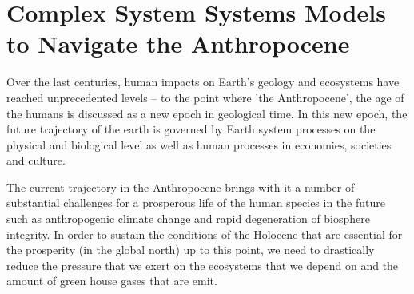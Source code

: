 \section{Complex System Systems Models to Navigate the Anthropocene}


Over the last centuries, human impacts on Earth's geology and ecosystems have reached unprecedented levels -- to the point where 'the Anthropocene', the age of the humans is discussed as a new epoch in geological time. In this new epoch, the future trajectory of the earth is governed by Earth system processes on the physical and biological level as well as human processes in economies, societies and culture.

The current trajectory in the Anthropocene brings with it a number of substantial challenges for a prosperous life of the human species in the future such as anthropogenic climate change and rapid degeneration of biosphere integrity. In order to sustain the conditions of the Holocene that are essential for the prosperity (in the global north) up to this point, we need to drastically reduce the pressure that we exert on the ecosystems that we depend on and the amount of green house gases that are emit.

